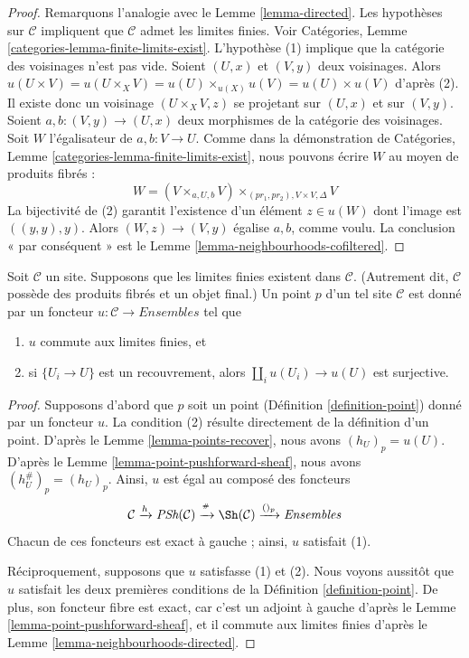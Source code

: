 \begin{proof}
Remarquons l’analogie avec le Lemme \ref{lemma-directed}.
Les hypothèses sur $\mathcal{C}$ impliquent que $\mathcal{C}$ admet les limites finies.
Voir Catégories, Lemme \ref{categories-lemma-finite-limits-exist}.
L’hypothèse (1) implique que la catégorie des voisinages
n’est pas vide. Soient $(U, x)$ et $(V, y)$ deux voisinages.
Alors
$u(U \times V) = u(U \times_X V) =
u(U) \times_{u(X)} u(V) = u(U) \times u(V)$ d’après (2).
Il existe donc un voisinage $(U \times_X V, z)$ se projetant
sur $(U, x)$ et sur $(V, y)$.
Soient $a, b : (V, y) \to (U, x)$ deux morphismes
de la catégorie des voisinages. Soit $W$ l’égalisateur de
$a, b : V \to U$. Comme dans la démonstration de
Catégories, Lemme \ref{categories-lemma-finite-limits-exist},
nous pouvons écrire $W$ au moyen de produits fibrés :
$$
W = (V \times_{a, U, b} V) \times_{(pr_1, pr_2), V \times V, \Delta} V
$$
La bijectivité de (2) garantit l’existence d’un élément $z \in u(W)$
dont l’image est $((y, y), y)$.
Alors $(W, z) \to (V, y)$ égalise $a, b$, comme voulu.
La conclusion « par conséquent » est le Lemme \ref{lemma-neighbourhoods-cofiltered}.
\end{proof}

\begin{proposition}
\label{proposition-point-limits}
Soit $\mathcal{C}$ un site. Supposons que les limites finies existent
dans $\mathcal{C}$. (Autrement dit, $\mathcal{C}$ possède des produits fibrés et un
objet final.) Un point $p$ d’un tel site $\mathcal{C}$
est donné par un foncteur $u : \mathcal{C} \to \textit{Ensembles}$ tel que
\begin{enumerate}
\item $u$ commute aux limites finies, et
\item si $\{U_i \to U\}$ est un recouvrement, alors
$\coprod_i u(U_i) \to u(U)$ est surjective.
\end{enumerate}
\end{proposition}

\begin{proof}
Supposons d’abord que $p$ soit un point (Définition \ref{definition-point})
donné par un foncteur $u$. La condition (2) résulte directement de
la définition d’un point. D’après le Lemme \ref{lemma-points-recover},
nous avons $(h_U)_p = u(U)$. D’après le Lemme \ref{lemma-point-pushforward-sheaf},
nous avons $(h_U^\#)_p = (h_U)_p$. Ainsi, $u$
est égal au composé des foncteurs
$$
\mathcal{C} \xrightarrow{h}
\textit{PSh}(\mathcal{C}) \xrightarrow{{}^\#}
\Sh(\mathcal{C}) \xrightarrow{()_p}
\textit{Ensembles}
$$
Chacun de ces foncteurs est exact à gauche ; ainsi, $u$ satisfait (1).

\medskip\noindent
Réciproquement, supposons que $u$ satisfasse (1) et (2).
Nous voyons aussitôt que $u$ satisfait les deux premières
conditions de la Définition \ref{definition-point}. De plus, son
foncteur fibre est exact, car c’est un adjoint à gauche d’après le
Lemme \ref{lemma-point-pushforward-sheaf}, et il commute
aux limites finies d’après le Lemme \ref{lemma-neighbourhoods-directed}.
\end{proof}


